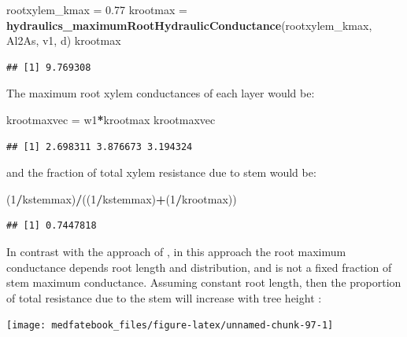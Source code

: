 \documentclass[]{book}
\newenvironment{Shaded}{\begin{snugshade}}{\end{snugshade}}
\newcommand{\KeywordTok}[1]{\textcolor[rgb]{0.13,0.29,0.53}{\textbf{#1}}}
\newcommand{\DecValTok}[1]{\textcolor[rgb]{0.00,0.00,0.81}{#1}}
\newcommand{\FloatTok}[1]{\textcolor[rgb]{0.00,0.00,0.81}{#1}}
\newcommand{\StringTok}[1]{\textcolor[rgb]{0.31,0.60,0.02}{#1}}
\newcommand{\OperatorTok}[1]{\textcolor[rgb]{0.81,0.36,0.00}{\textbf{#1}}}
\newcommand{\NormalTok}[1]{#1}
\begin{document}
\begin{Shaded}
\begin{Highlighting}[]
\NormalTok{rootxylem_kmax =}\StringTok{ }\FloatTok{0.77}
\NormalTok{krootmax =}\StringTok{ }\KeywordTok{hydraulics_maximumRootHydraulicConductance}\NormalTok{(rootxylem_kmax, Al2As, }
\NormalTok{                                                      v1, d)}
\NormalTok{krootmax}
\end{Highlighting}
\end{Shaded}

\begin{verbatim}
## [1] 9.769308
\end{verbatim}

The maximum root xylem conductances of each layer would be:

\begin{Shaded}
\begin{Highlighting}[]
\NormalTok{krootmaxvec =}\StringTok{ }\NormalTok{w1}\OperatorTok{*}\NormalTok{krootmax}
\NormalTok{krootmaxvec}
\end{Highlighting}
\end{Shaded}

\begin{verbatim}
## [1] 2.698311 3.876673 3.194324
\end{verbatim}

and the fraction of total xylem resistance due to stem would be:

\begin{Shaded}
\begin{Highlighting}[]
\NormalTok{(}\DecValTok{1}\OperatorTok{/}\NormalTok{kstemmax)}\OperatorTok{/}\NormalTok{((}\DecValTok{1}\OperatorTok{/}\NormalTok{kstemmax)}\OperatorTok{+}\NormalTok{(}\DecValTok{1}\OperatorTok{/}\NormalTok{krootmax))}
\end{Highlighting}
\end{Shaded}

\begin{verbatim}
## [1] 0.7447818
\end{verbatim}

In contrast with the approach of \citet{Christoffersen2016}, in this
approach the root maximum conductance depends root length and
distribution, and is not a fixed fraction of stem maximum conductance.
Assuming constant root length, then the proportion of total resistance
due to the stem will increase with tree height \citep{Magnani2000}:

\begin{center}\texttt{[image: medfatebook\_files/figure-latex/unnamed-chunk-97-1]} \end{center}
\end{document}
